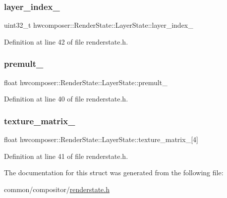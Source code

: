 \subsubsection{\texorpdfstring{layer\+\_\+index\+\_\+}{layer\_index\_}}
{\footnotesize\ttfamily uint32\+\_\+t hwcomposer\+::\+Render\+State\+::\+Layer\+State\+::layer\+\_\+index\+\_\+}



Definition at line 42 of file renderstate.\+h.

\mbox{\label{structhwcomposer_1_1RenderState_1_1LayerState_a43d36ca83789cac1c1957df1f032c1ee}} 
\subsubsection{\texorpdfstring{premult\+\_\+}{premult\_}}
{\footnotesize\ttfamily float hwcomposer\+::\+Render\+State\+::\+Layer\+State\+::premult\+\_\+}



Definition at line 40 of file renderstate.\+h.

\mbox{\label{structhwcomposer_1_1RenderState_1_1LayerState_afd84107447feedca42841c54c877c96c}} 
\subsubsection{\texorpdfstring{texture\+\_\+matrix\+\_\+}{texture\_matrix\_}}
{\footnotesize\ttfamily float hwcomposer\+::\+Render\+State\+::\+Layer\+State\+::texture\+\_\+matrix\+\_\+\mbox{[}4\mbox{]}}



Definition at line 41 of file renderstate.\+h.



The documentation for this struct was generated from the following file\+:\begin{DoxyCompactItemize}
\item 
common/compositor/\mbox{\hyperlink{renderstate_8h}{renderstate.\+h}}\end{DoxyCompactItemize}
